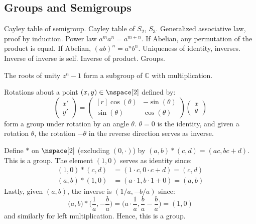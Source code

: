     \subsection{Groups and Semigroups}
        Cayley table of semigroup. Cayley table of $S_{2}$, $S_{3}$.
        Generalized associative law, proof by induction. Power law
        $a^{m}a^{n}=a^{m+n}$. If Abelian, any permutation of the product is
        equal. If Abelian, $(ab)^{n}=a^{n}b^{n}$. Uniqueness of identity,
        inverses. Inverse of inverse is self. Inverse of product. Groups.
        \begin{example}
            The roots of unity $z^{n}-1$ form a subgroup of $\mathbb{C}$
            with multiplication.
        \end{example}
        \begin{example}
            Rotations about a point $(x,y)\in\nspace[2]$ defined by:
            \begin{equation}
                \begin{pmatrix}
                    x'\\
                    y'
                \end{pmatrix}=
                \begin{pmatrix*}[r]
                    \cos(\theta)&\minus\sin(\theta)\\
                    \sin(\theta)&\cos(\theta)
                \end{pmatrix*}
                \begin{pmatrix}
                    x\\
                    y
                \end{pmatrix}
            \end{equation}
            form a group under rotation by an angle $\theta$. $\theta=0$ is
            the identity, and given a rotation $\theta$, the rotation
            $\minus\theta$ in the reverse direction serves as inverse.
        \end{example}
        \begin{example}
            Define $*$ on $\nspace[2]$ (excluding $(0,\cdot)$) by
            $(a,b)*(c,d)=(ac,bc+d)$. This is a group. The element $(1,0)$
            serves as identity since:
            \begin{align}
                (1,0)*(c,d)&=(1\cdot{c},0\cdot{c}+d)=(c,d)\\
                (a,b)*(1,0)&=(a\cdot{1},b\cdot{1}+0)=(a,b)
            \end{align}
            Lastly, given $(a,b)$, the inverse is $(1/a,\minus{b}/a)$ since:
            \begin{equation}
                \big(a,b\big)*\big(\frac{1}{a},\minus\frac{b}{a}\big)
                    =\big(a\cdot\frac{1}{a},\frac{b}{a}-\frac{b}{a}\big)
                    =(1,0)
            \end{equation}
            and similarly for left multiplication. Hence, this is a group.
        \end{example}
